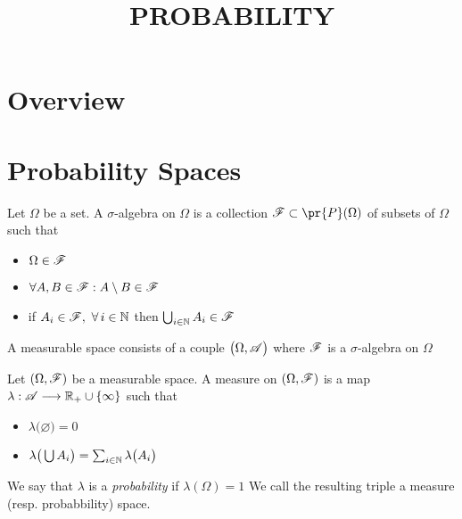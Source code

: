 

\usepackage{calrsfs}


\title{PROBABILITY}

\maketitle	

\noindent\hrulefill
\tableofcontents
\noindent\hrulefill

\label{section-phantom}



\section{Overview}
\label{section:overview}


\section{Probability Spaces}
\label{section:measurable_spaces}

\begin{definition}
\label{definition:measurable_space}
Let $\Omega$ be a set. A $\sigma$-algebra on $\Omega$ is a collection $\r{F}\subset \pr{P}(\Omega)$ of subsets of $\Omega$ such that
\begin{itemize}
\item $\Omega \in \r{F}$
\item $\forall A, B \in\r{F}: A\setminus B \in\r{F}$
\item if $A_i\in\r{F},\,\,\forall \,i \in \d{N}$ then $\bigcup_{i \in \d{N}} A_i \in \r{F}$
\end{itemize}
A measurable space consists of a couple $\big(\Omega,\r{A}\big)$ where $\r{F}$ is a $\sigma$-algebra on $\Omega$
\end{definition}

\begin{definition}
\label{definition:probability_space}
Let $(\Omega,\r{F})$ be a measurable space. A measure on $(\Omega,\r{F})$ is a map $\lambda:\r{A}\mor \d{R}_+ \cup \{\infty\}$ such that 
\begin{itemize}
\item $\lambda\big(\varnothing) = 0$
\item $\lambda\big(\bigcup A_i\big) = \sum_{i \in \mathbb{N}} \lambda\big(A_i\big)$
\end{itemize}
We say that $\lambda$ is a \emph{probability} if $\lambda(\Omega)=1$
We call the resulting triple a measure (resp. probabbility) space.
\end{definition}

